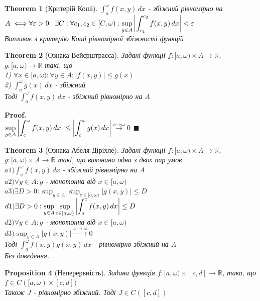 \documentclass[a4paper, 14pt]{extarticle}
\def\huge{\displaystyle}
\def\bigline{\vspace{5mm}\\}
\theoremstyle{theoremdd}
\newtheorem{theorem}{Theorem}[subsection]
\theoremstyle{theoremdd}
\theoremstyle{theoremdd}
\theoremstyle{theoremdd}
\theoremstyle{theoremdd}
\newtheorem{proposition}[theorem]{Proposition}
\theoremstyle{theoremdd}
\theoremstyle{theoremdd}
\theoremstyle{theoremdd}
\newenvironment{pf}{\vspace*{-3mm} \textbf{Proof. \\}}{$\blacksquare$}
\begin{document}
\begin{theorem}[Критерій Коші]
$\huge \int_a^\omega f(x,y)\,dx$ - збіжний рівномірно на $A \iff \\ \forall \varepsilon > 0: \exists C: \forall c_1,c_2 \in [C,\omega): \huge \sup_{y \in A} \abs{\int_{c_1}^{c_2} f(x,y)\,dx} < \varepsilon$\\
\textit{Випливає з критерію Коші рівномірної збіжності функцій}
\end{theorem}

\begin{theorem}[Ознака Вейєрштрасса]
Задані функції $f: [a,\omega) \times A \to \mathbb{R}$, $g: [a,\omega) \to \mathbb{R}$ такі, що\\
1) $\forall x \in [a,\omega): \forall y \in A: |f(x,y)| \leq g(x)$\\
2) $\huge \int_a^\omega g(x)\,dx$ - збіжний\\
Тоді $\huge \int_a^\omega f(x,y)\,dx$ - збіжний рівномірно на $A$
\end{theorem}

\begin{pf}
$\huge \sup_{y \in A} \abs{\int_c^\omega f(x,y)\,dx} \leq \abs{\int_c^\omega g(x)\,dx} \overset{c \to \omega}{\to} 0$
\end{pf}

\begin{theorem}[Ознака Абеля-Діріхле]
Задані функції $f: [a,\omega) \times A \to \mathbb{R}$, $g: [a,\omega) \times A \to \mathbb{R}$ такі, що виконана одна з двох пар умов\\
$a1) \huge \int_a^\omega f(x,y)\,dx$ - збіжний рівномірно на $A$\\
$a2) \forall y \in A: g$ - монотонна від $x \in [a,\omega)$\\
$a3) \exists D>0: \huge \sup_{y \in A} \sup_{c \in [a,\omega)} |g(x,y)| \leq D$
\bigline
$d1) \exists D>0: \huge \sup_{y \in A} \sup_{c \in [a,\omega)} \abs{\int_a^c f(x,y)\,dx} \leq D$\\
$d2) \forall y \in A: g$ - монотонна від $x \in [a,\omega)$\\
$d3) \huge \sup_{y \in A} |g(x,y)| \overset{x \to \omega}{\to} 0$\\
Тоді $\huge \int_a^\omega f(x,y) g(x,y)\,dx$ - рівномірно збіжний на $A$\\
\textit{Без доведення.}
\end{theorem}

\begin{proposition}[Неперервність]
Задана функція $f: [a,\omega) \times [c,d] \to \mathbb{R}$, така, що $f \in C([a,\omega) \times [c,d])$\\
Також $J$ - рівномірно збіжний. Тоді $J \in C([c,d])$
\end{proposition}
\end{document}
